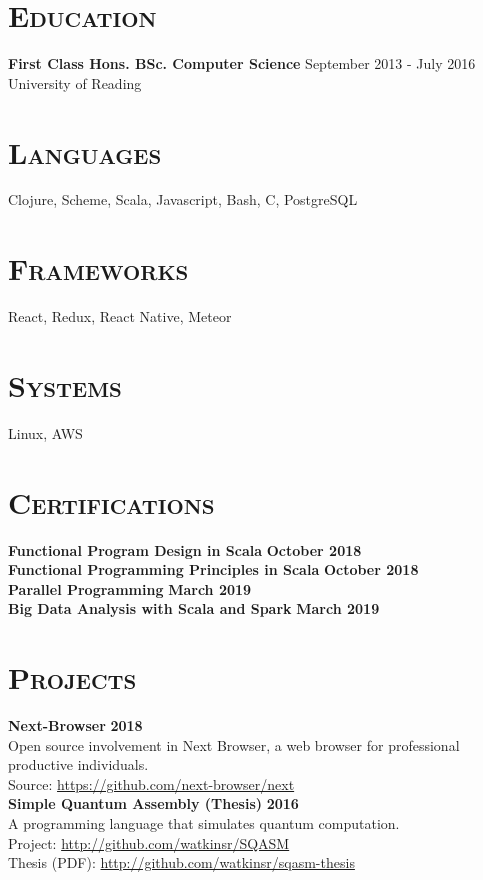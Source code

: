 \documentclass[line, margin, 10pt]{res}
\begin{document}
\begin{resume}
\section{\textsc{Education}}
{\bf First Class Hons. BSc. Computer Science}  {\hfill September 2013 - July 2016}\\
University of Reading

\section{\textsc{Languages}}
Clojure, Scheme, Scala, Javascript, Bash, C, PostgreSQL

\section{\textsc{Frameworks}}
React, Redux, React Native, Meteor

\section{\textsc {Systems}}
Linux, AWS \\

\section{\textsc{Certifications}}
{\bf Functional Program Design in Scala} {\bf \hfill October 2018}\\
{\bf Functional Programming Principles in Scala} {\bf \hfill October 2018}\\
{\bf Parallel Programming} {\bf \hfill March 2019}\\
{\bf Big Data Analysis with Scala and Spark} {\bf \hfill March 2019}\\

\newpage
\section{\textsc{Projects}}

{\bf Next-Browser} {\bf \hfill 2018}\\
Open source involvement in Next Browser, a web browser for professional productive individuals.\\
Source: \url{https://github.com/next-browser/next}\\

{\bf Simple Quantum Assembly (Thesis)} {\bf \hfill 2016}\\
A programming language that simulates quantum computation.\\
Project: \url{http://github.com/watkinsr/SQASM}\\
Thesis (PDF): \url{http://github.com/watkinsr/sqasm-thesis}\\


\end{resume}
\end{document}
